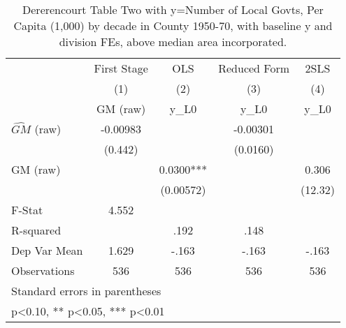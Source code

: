 \begin{table}[htbp]\centering
\def\sym#1{\ifmmode^{#1}\else\(^{#1}\)\fi}
\caption{Dererencourt Table Two with y=Number of Local Govts, Per Capita (1,000) by decade in County 1950-70, with baseline y and division FEs, above median area incorporated.}
\begin{tabular}{l*{4}{c}}
\toprule
                    & First Stage   &         OLS   &Reduced Form   &        2SLS   \\
                    &\multicolumn{1}{c}{(1)}&\multicolumn{1}{c}{(2)}&\multicolumn{1}{c}{(3)}&\multicolumn{1}{c}{(4)}\\
                    &\multicolumn{1}{c}{GM  (raw)}&\multicolumn{1}{c}{y\_L0}&\multicolumn{1}{c}{y\_L0}&\multicolumn{1}{c}{y\_L0}\\
\midrule
$\hat{GM}$ (raw)    &    -0.00983   &               &    -0.00301   &               \\
                    &     (0.442)   &               &    (0.0160)   &               \\
\addlinespace
GM  (raw)           &               &      0.0300***&               &       0.306   \\
                    &               &   (0.00572)   &               &     (12.32)   \\
\midrule
F-Stat              &       4.552   &               &               &               \\
R-squared           &               &        .192   &        .148   &               \\
Dep Var Mean        &       1.629   &       -.163   &       -.163   &       -.163   \\
Observations        &         536   &         536   &         536   &         536   \\
\bottomrule
\multicolumn{5}{l}{\footnotesize Standard errors in parentheses}\\
\multicolumn{5}{l}{\footnotesize * p<0.10, ** p<0.05, *** p<0.01}\\
\end{tabular}
\end{table}
